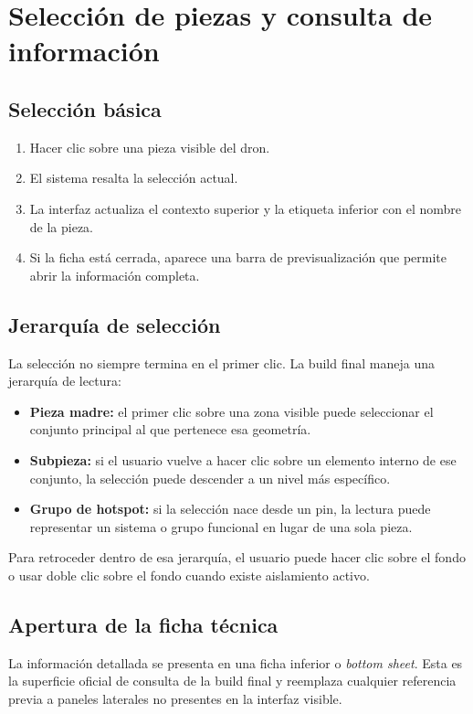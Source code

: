 \documentclass[12pt,letterpaper]{article}
\begin{document}
\section{Selección de piezas y consulta de información}

\subsection{Selección básica}
\begin{enumerate}
    \item Hacer clic sobre una pieza visible del dron.
    \item El sistema resalta la selección actual.
    \item La interfaz actualiza el contexto superior y la etiqueta inferior con el nombre de la pieza.
    \item Si la ficha está cerrada, aparece una barra de previsualización que permite abrir la información completa.
\end{enumerate}

\subsection{Jerarquía de selección}
La selección no siempre termina en el primer clic. La build final maneja una jerarquía de lectura:
\begin{itemize}
    \item \textbf{Pieza madre:} el primer clic sobre una zona visible puede seleccionar el conjunto principal al que pertenece esa geometría.
    \item \textbf{Subpieza:} si el usuario vuelve a hacer clic sobre un elemento interno de ese conjunto, la selección puede descender a un nivel más específico.
    \item \textbf{Grupo de hotspot:} si la selección nace desde un pin, la lectura puede representar un sistema o grupo funcional en lugar de una sola pieza.
\end{itemize}

\noindent Para retroceder dentro de esa jerarquía, el usuario puede hacer clic sobre el fondo o usar doble clic sobre el fondo cuando existe aislamiento activo.

\subsection{Apertura de la ficha técnica}
La información detallada se presenta en una ficha inferior o \textit{bottom sheet}. Esta es la superficie oficial de consulta de la build final y reemplaza cualquier referencia previa a paneles laterales no presentes en la interfaz visible.
\end{document}
